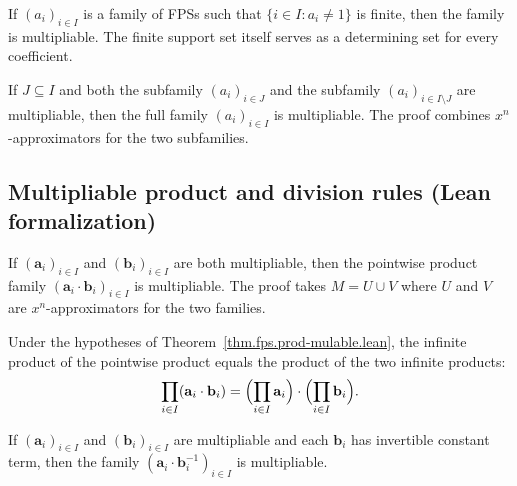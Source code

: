 \begin{theorem}
\label{thm.fps.1-mulable.lean}
\leanhelper
\leanok
If $(a_i)_{i \in I}$ is a family of FPSs such that
$\{i \in I : a_i \neq 1\}$ is finite, then the family is multipliable.
The finite support set itself serves as a determining set for every coefficient.
\end{theorem}

\begin{theorem}
\label{thm.fps.union-mulable.lean}
\leanhelper
\leanok
If $J \subseteq I$ and both the subfamily $(a_i)_{i \in J}$ and the subfamily
$(a_i)_{i \in I \setminus J}$ are multipliable, then the full family $(a_i)_{i \in I}$
is multipliable. The proof combines $x^n$-approximators for the two subfamilies.
\end{theorem}

\subsection{Multipliable product and division rules (Lean formalization)}

\begin{theorem}
\label{thm.fps.prod-mulable.lean}
\leanhelper
\leanok
If $(\mathbf{a}_i)_{i \in I}$ and $(\mathbf{b}_i)_{i \in I}$ are both multipliable,
then the pointwise product family $(\mathbf{a}_i \cdot \mathbf{b}_i)_{i \in I}$ is multipliable.
The proof takes $M = U \cup V$ where $U$ and $V$ are $x^n$-approximators for the two families.
\end{theorem}

\begin{theorem}
\label{thm.fps.prod-mulable-eq.lean}
\leanhelper
\leanok
Under the hypotheses of Theorem~\ref{thm.fps.prod-mulable.lean}, the infinite product
of the pointwise product equals the product of the two infinite products:
\[
\prod_{i \in I} (\mathbf{a}_i \cdot \mathbf{b}_i)
= \Bigl(\prod_{i \in I} \mathbf{a}_i\Bigr) \cdot \Bigl(\prod_{i \in I} \mathbf{b}_i\Bigr).
\]
\end{theorem}

\begin{theorem}
\label{thm.fps.div-mulable.lean}
\leanhelper
\leanok
If $(\mathbf{a}_i)_{i \in I}$ and $(\mathbf{b}_i)_{i \in I}$ are multipliable and
each $\mathbf{b}_i$ has invertible constant term, then the family
$(\mathbf{a}_i \cdot \mathbf{b}_i^{-1})_{i \in I}$ is multipliable.
\end{theorem}

